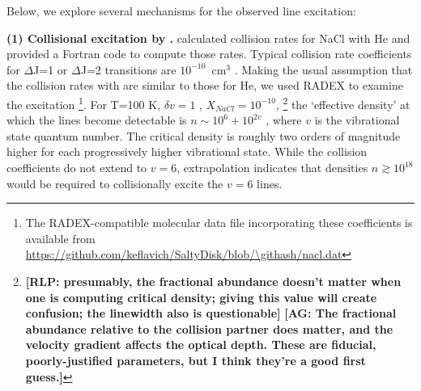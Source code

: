 \documentclass[twocolumn]{aastex62}
\newcommand{\rlp}[1]{\textcolor{blue!65!black}{\textbf{[RLP: #1]}}}
\newcommand{\ag}[1]{\textcolor{red!65!black}{\textbf{[AG: #1]}}}
\begin{document}

Below, we explore several mechanisms for the observed line excitation:

\par{\textbf{(1) Collisional excitation by \hh.}} 
%
%
\citet{Quintana-Lacaci2016a} calculated collision rates for NaCl with He and
provided a Fortran code to compute those rates.  Typical collision rate coefficients for
\hbox{$\Delta$J=1} or \hbox{$\Delta$J=2} transitions are $10^{-10}$~cm$^3$ \pers.  Making the usual
assumption that the collision rates with \hh are similar to those for He, we used
RADEX \citep{Vandertak2007} to examine the excitation \footnote{The
RADEX-compatible molecular data
file incorporating these coefficients is available from
\url{https://github.com/keflavich/SaltyDisk/blob/\githash/nacl.dat}}.
For T=100 K, $\delta v=1$ \kms \perpc, $X_{NaCl}=10^{-10}$,
\footnote{\rlp{presumably,
the fractional abundance doesn't matter when one is computing critical density;
giving this value will create confusion; the linewidth also is questionable}
\ag{The fractional abundance relative to the collision partner does matter,
and the velocity gradient affects the optical depth.  These are fiducial,
poorly-justified parameters, but I think they're a good first guess.}
}
the `effective density' at which the lines become detectable is $n\sim10^{6} +
10^{2v}$ \percc, where $v$ is the vibrational state quantum number.  The
critical density is roughly two orders of magnitude higher for each
progressively higher vibrational state.  While the collision coefficients do
not extend to $v=6$, extrapolation indicates that \hh densities
$n\gtrsim10^{18}$ \percc would be required to collisionally excite the $v=6$
lines.
\end{document}
